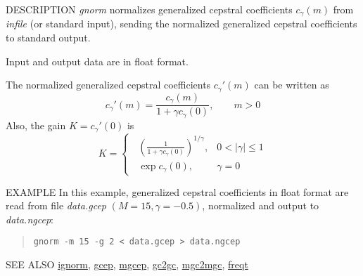 \begin{qsection}{DESCRIPTION}
{\em gnorm} normalizes generalized cepstral coefficients $c_\gamma(m)$ 
from {\em infile} (or standard input), 
sending the normalized generalized cepstral coefficients to standard output.

Input and output data are in float format.

The normalized generalized cepstral coefficients $c_\gamma'(m)$
can be written as
\begin{displaymath}
c_\gamma'(m) = \frac{c_\gamma(m)}{1+\gamma c_\gamma(0)}, \qquad m>0
\end{displaymath}
Also, the gain $K = c_\gamma'(0)$ is
\begin{displaymath}
K = \begin{cases} \;\;\displaystyle
	  \left(\frac{1}{1+\gamma c_\gamma(0)}\right)^{1/\gamma},
		& 0<|\gamma|\leq 1 \\ \;\;\displaystyle
	  \exp c_\gamma(0),  & \gamma=0
	\end{cases}
\end{displaymath}
\end{qsection}

\begin{options}
\end{options}

\begin{qsection}{EXAMPLE}
In this example, generalized cepstral coefficients in float format
are read from file {\em data.gcep} $(M=15, \gamma=-0.5)$,
normalized and output to {\em data.ngcep}:
\begin{quote}
 \verb!gnorm -m 15 -g 2 < data.gcep > data.ngcep!
\end{quote} 
\end{qsection}

\begin{qsection}{SEE ALSO}
\hyperlink{ignorm}{ignorm},
\hyperlink{gcep}{gcep},
\hyperlink{mgcep}{mgcep},
\hyperlink{gc2gc}{gc2gc},
\hyperlink{mgc2mgc}{mgc2mgc},
\hyperlink{freqt}{freqt}
\end{qsection}
